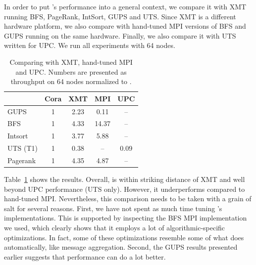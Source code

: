 In order to put \Grappa's performance into a general context, we compare it
with XMT running BFS, PageRank, IntSort, GUPS and UTS. Since XMT is a
different hardware platform, we also compare \Grappa with hand-tuned MPI
versions of BFS and GUPS running on the same hardware. Finally, we also
compare it with UTS written for UPC. We run all experiments with 64 nodes.


\begin{table}[htb]
\begin{center}
\begin{tabular}{l|c|c|c|c}
&	Cora &      XMT	&        MPI	&   UPC \\ \hline
GUPS	& 1	& 2.23	& 0.11& 	-- \\ 
BFS	& 1 &	4.33	& 14.37 & 	-- \\ 
Intsort	& 1	& 3.77 &	5.88	& -- \\
UTS (T1)	& 1	& 0.38	& -- &	0.09 \\ 
Pagerank	& 1	& 4.35	& 4.87 &	-- \\ 
\end{tabular}
\end{center}
\caption{Comparing \Grappa with XMT, hand-tuned MPI and UPC. Numbers are presented as throughput on 64 nodes normalized to \Grappa.}
\label{tab:grappa-comparisons}
\end{table}


Table~\ref{tab:grappa-comparisons} shows the results. Overall, \Grappa is
within striking distance of XMT and well beyond UPC performance (UTS only).
However, it underperforms compared to hand-tuned MPI. Nevertheless, this
comparison needs to be taken with a grain of salt for several reasons. First,
we have not spent as much time tuning \Grappa's implementations. This is
supported by inspecting the BFS MPI implementation we used, which clearly
shows that it employs a lot of algorithmic-specific optimizations. In fact,
some of these optimizations resemble some of what \Grappa does automatically,
like message aggregation. Second, the GUPS results presented earlier suggests
that \Grappa performance can do a lot better. 

